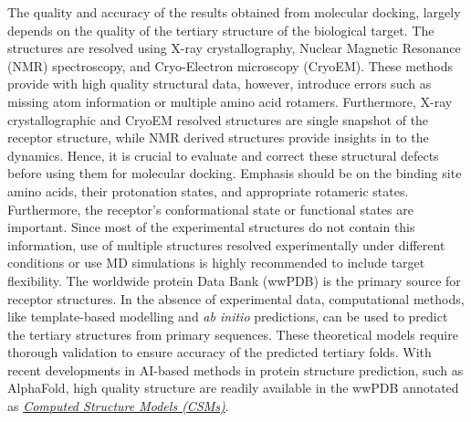 %
The quality and accuracy of the results obtained from molecular docking, largely depends on the quality of the tertiary structure of the biological target. The structures are resolved using X-ray crystallography, Nuclear Magnetic Resonance (NMR) spectroscopy, and Cryo-Electron microscopy (CryoEM). These methods provide with high quality structural data, however, introduce errors such as missing atom information or multiple amino acid rotamers\cite{bib55, bib56}. Furthermore, X-ray crystallographic and CryoEM resolved structures are single snapshot of the receptor structure, while NMR derived structures provide insights in to the dynamics. Hence, it is crucial to evaluate and correct these structural defects before using them for molecular docking. Emphasis should be on the binding site amino acids, their protonation states, and appropriate rotameric states. Furthermore, the receptor's conformational state or functional states are important. Since most of the experimental structures do not contain this information, use of multiple structures resolved experimentally under different conditions or use MD simulations is highly recommended to include target flexibility. The worldwide protein Data Bank (wwPDB) is the primary source for receptor structures\cite{bib41}. In the absence of experimental data, computational methods, like template-based modelling and \textit{ab initio} predictions, can be used to predict the tertiary structures from primary sequences.  These theoretical models require thorough validation to ensure accuracy of the predicted tertiary folds. With recent developments in AI-based methods in protein structure prediction, such as AlphaFold\cite{bib37}, high quality structure are readily available in the wwPDB annotated as \href{https://pdb101.rcsb.org/learn/guide-to-understanding-pdb-data/computed-structure-models}{\textit{Computed Structure Models (CSMs)}}.


